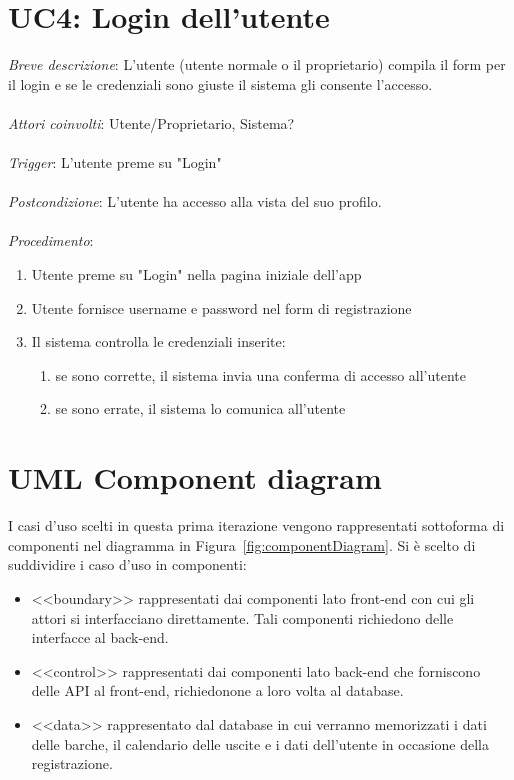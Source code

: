 \section{UC4: Login dell'utente}
\emph{Breve descrizione}: L'utente (utente normale o il proprietario) compila il form per il login e se le credenziali sono giuste il sistema gli consente l'accesso.\\\\
\emph{Attori coinvolti}: Utente/Proprietario, Sistema?\\\\
\emph{Trigger}: L'utente preme su "Login"\\\\
\emph{Postcondizione}: L'utente ha accesso alla vista del suo profilo.\\\\
\emph{Procedimento}:
\begin{enumerate}
    \item Utente preme su "Login" nella pagina iniziale dell'app
    \item Utente fornisce username e password nel form di registrazione
    \item Il sistema controlla le credenziali inserite:
          \begin{enumerate}
              \item se sono corrette, il sistema invia una conferma di accesso all'utente
              \item se sono errate, il sistema lo comunica all'utente
          \end{enumerate}
\end{enumerate}

\section{UML Component diagram}
I casi d'uso scelti in questa prima iterazione vengono rappresentati sottoforma di componenti nel diagramma in Figura~\ref{fig:componentDiagram}.
Si è scelto di suddividire i caso d'uso in componenti:

\begin{itemize}
    \item <<boundary>> rappresentati dai componenti lato front-end con cui gli attori si interfacciano direttamente. Tali componenti richiedono delle interfacce al back-end.
    \item <<control>> rappresentati dai componenti lato back-end che forniscono delle API al front-end, richiedonone a loro volta al database.
    \item <<data>> rappresentato dal database in cui verranno memorizzati i dati delle barche, il calendario delle uscite e i dati dell'utente in occasione della registrazione.
\end{itemize}

